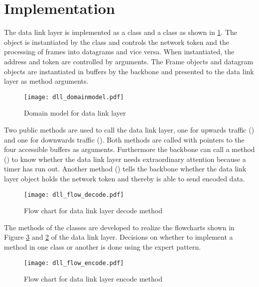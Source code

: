 \section{Implementation}
The data link layer is implemented as a  class and a
 class as shown in \ref{fig:class_diag_for_datalink}. The
 object is instantiated by the  class and
controls the network token and the processing of frames into datagrams and vice
versa. When instantiated, the address and token are controlled by arguments. The
Frame objects and datagram objects are instantiated in buffers by the backbone
and presented to the data link layer as method arguments.

\begin{figure}[htb]
	\centering
	\texttt{[image: dll\_domainmodel.pdf]}
	\caption{Domain model for data link layer}
	\label{fig:class_diag_for_datalink}	
\end{figure}

Two public methods are used to call the data link layer, one for upwards traffic
() and one for downwards traffic (). Both methods are called with
pointers to the four accessible buffers as arguments. Furthermore the backbone
can call a method () to know whether the data link layer needs
extraordinary attention because a timer has run out. Another method
() tells the backbone whether the data link layer object holds the
network token and thereby is able to send encoded data.

\begin{figure}[htb]
	\centering
	\texttt{[image: dll\_flow\_decode.pdf]}
	\caption{Flow chart for data link layer decode method}
	\label{fig:dll_flow_decode}	
\end{figure}

The methods of the classes are developed to realize the
flowcharts shown in Figure \ref{fig:dll_flow_encode} and
\ref{fig:dll_flow_decode} of the data link layer. Decisions on whether to implement a method in one class or another is done using the expert pattern.

\begin{figure}[htb]
	\begin{center}
	\texttt{[image: dll\_flow\_encode.pdf]}
	\caption{Flow chart for data link layer encode method}
	\label{fig:dll_flow_encode}	
	\end{center}
\end{figure}

